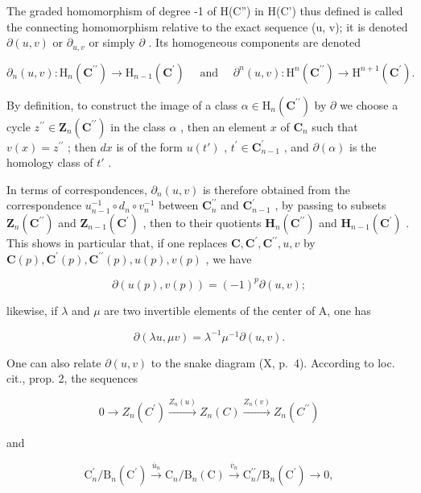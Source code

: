 The graded homomorphism of degree -1 of H(C'') in H(C') thus defined is called the connecting homomorphism relative to the exact sequence (u, v); it is denoted \(\partial(u, v)\) or \(\partial_{u,v}\) or simply \(\partial\) . Its homogeneous components are denoted

\[
\partial_ {n} (u, v): \mathrm{H} _ {n} (\mathbf {C} ^ {\prime \prime}) \rightarrow \mathrm{H} _ {n - 1} (\mathbf {C} ^ {\prime}) \quad \text { and } \quad \partial^ {n} (u, v): \mathrm{H} ^ {n} (\mathbf {C} ^ {\prime \prime}) \rightarrow \mathrm{H} ^ {n + 1} (\mathbf {C} ^ {\prime}).
\]

By definition, to construct the image of a class \(\alpha\in\mathrm{H}_{n}(\mathbf{C}^{\prime\prime})\) by \(\partial\) we choose a cycle \(z^{\prime\prime}\in\mathbf{Z}_{n}(\mathbf{C}^{\prime\prime})\) in the class \(\alpha\) , then an element \(x\) of \(\mathbf{C}_{n}\) such that \(v(x)=z^{\prime\prime}\) ; then \(dx\) is of the form \(u(t')\) , \(t^{\prime}\in\mathbf{C}_{n-1}^{\prime}\) , and \(\partial(\alpha)\) is the homology class of \(t'\) .

In terms of correspondences, \(\partial_{n}(u,v)\) is therefore obtained from the correspondence \(u_{n-1}^{-1}\circ d_{n}\circ v_{n}^{-1}\) between \(\mathbf{C}_{n}^{\prime\prime}\) and \(\mathbf{C}_{n-1}^{\prime}\) , by passing to subsets \(\mathbf{Z}_{n}(\mathbf{C}^{\prime\prime})\) and \(\mathbf{Z}_{n-1}(\mathbf{C}^{\prime})\) , then to their quotients \(\mathbf{H}_{n}(\mathbf{C}^{\prime\prime})\) and \(\mathbf{H}_{n-1}(\mathbf{C}^{\prime})\) . This shows in particular that, if one replaces \(\mathbf{C},\mathbf{C}^{\prime},\mathbf{C}^{\prime\prime},u,v\) by \(\mathbf{C}(p),\mathbf{C}^{\prime}(p),\mathbf{C}^{\prime\prime}(p),u(p),v(p)\) , we have

\[
\partial (u (p), v (p)) = (- 1) ^ {p} \partial (u, v);\tag{4}
\]

likewise, if \(\lambda\) and \(\mu\) are two invertible elements of the center of A, one has

\[
\partial (\lambda u, \mu v) = \lambda^ {- 1} \mu^ {- 1} \partial (u, v).\tag{5}
\]

One can also relate \(\partial(u,v)\) to the snake diagram (X, p.~4). According to loc. cit., prop. 2, the sequences

\[
0 \longrightarrow Z _ {n} (C ^ {\prime}) \xrightarrow {Z _ {n} (u)} Z _ {n} (C) \xrightarrow {Z _ {n} (v)} Z _ {n} (C ^ {\prime \prime})
\]

and

\[
\mathrm{C} _ {n} ^ {\prime} / \mathrm{B} _ {n} (\mathrm{C} ^ {\prime}) \xrightarrow {\overline {{{u}}} _ {n}} \mathrm{C} _ {n} / \mathrm{B} _ {n} (\mathrm{C}) \xrightarrow {\overline {{{v}}} _ {n}} \mathrm{C} _ {n} ^ {\prime \prime} / \mathrm{B} _ {n} (\mathrm{C} ^ {\prime}) \longrightarrow 0,
\]

